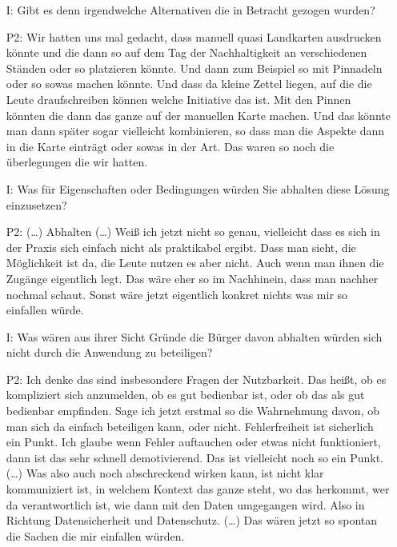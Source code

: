 \begin{itemize}
    \item[I:] Gibt es denn irgendwelche Alternativen die in Betracht gezogen wurden?
    \item[P2:] Wir hatten uns mal gedacht, dass manuell quasi Landkarten ausdrucken k{\"o}nnte und die dann so auf dem Tag der Nachhaltigkeit an verschiedenen St{\"a}nden oder so platzieren k{\"o}nnte. Und dann zum Beispiel so mit Pinnadeln oder so sowas machen k{\"o}nnte. Und dass da kleine Zettel liegen, auf die die Leute draufschreiben k{\"o}nnen welche Initiative das ist. Mit den Pinnen k{\"o}nnten die dann das ganze auf der manuellen Karte machen. Und das k{\"o}nnte man dann sp{\"a}ter sogar vielleicht kombinieren, so dass man die Aspekte dann in die Karte eintr{\"a}gt oder sowas in der Art. Das waren so noch die {\"u}berlegungen die wir hatten.
    \item[I:] Was f{\"u}r Eigenschaften oder Bedingungen w{\"u}rden Sie abhalten diese L{\"o}sung einzusetzen?
    \item[P2:] (\dots) Abhalten (\dots) Wei{\ss} ich jetzt nicht so genau, vielleicht dass es sich in der Praxis sich einfach nicht als praktikabel ergibt. Dass man sieht, die M{\"o}glichkeit ist da, die Leute nutzen es aber nicht. Auch wenn man ihnen die Zug{\"a}nge eigentlich legt. Das w{\"a}re eher so im Nachhinein, dass man nachher nochmal schaut. Sonst w{\"a}re jetzt eigentlich konkret nichts was mir so einfallen w{\"u}rde.
    \item[I:] Was w{\"a}ren aus ihrer Sicht Gr{\"u}nde die B{\"u}rger davon abhalten w{\"u}rden sich nicht durch die Anwendung zu beteiligen?
    \item[P2:] Ich denke das sind insbesondere Fragen der Nutzbarkeit. Das hei{\ss}t, ob es kompliziert sich anzumelden, ob es gut bedienbar ist, oder ob das als gut bedienbar empfinden. Sage ich jetzt erstmal so die Wahrnehmung davon, ob man sich da einfach beteiligen kann, oder nicht. Fehlerfreiheit ist sicherlich ein Punkt. Ich glaube wenn Fehler auftauchen oder etwas nicht funktioniert, dann ist das sehr schnell demotivierend. Das ist vielleicht noch so ein Punkt. (\dots) Was also auch noch abschreckend wirken kann, ist nicht klar kommuniziert ist, in welchem Kontext das ganze steht, wo das herkommt, wer da verantwortlich ist, wie dann mit den Daten umgegangen wird. Also in Richtung Datensicherheit und Datenschutz. (\dots) Das w{\"a}ren jetzt so spontan die Sachen die mir einfallen w{\"u}rden.
\end{itemize}

